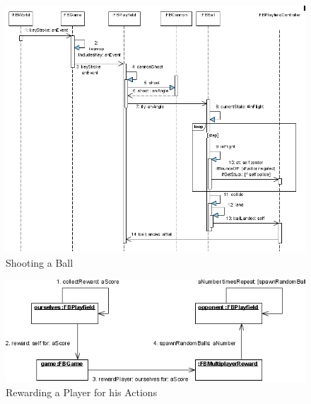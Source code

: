 \begin{figure}[bt]
  \begin{center}
    \includegraphics[width=\linewidth]{images/ShootingABall.png}
  \end{center}
  \caption{Shooting a Ball}
  \label{fig:ShootingABall}
\end{figure}
%
%
\begin{figure}[bt]
  \begin{center}
    \includegraphics[width=\linewidth]{images/RewardingAPlayer.png}
  \end{center}
  \caption{Rewarding a Player for his Actions}
  \label{fig:RewardingAPlayer}
\end{figure}
%